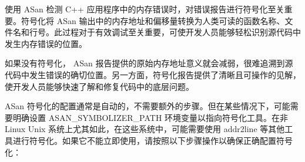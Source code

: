 
使用 ASan 检测 C++ 应用程序中的内存错误时，对错误报告进行符号化至关重要。符号化将 ASan 输出中的内存地址和偏移量转换为人类可读的函数名称、文件名和行号。此过程对于有效调试至关重要，可使开发人员能够轻松识别源代码中发生内存错误的位置。

如果没有符号化， ASan 报告提供的原始内存地址意义就会减弱，很难追溯到源代码中发生错误的确切位置。另一方面，符号化报告提供了清晰且可操作的见解，使开发人员能够快速了解和修复代码中的底层问题。

ASan 符号化的配置通常是自动的，不需要额外的步骤。但在某些情况下，可能需要明确设置 ASAN\_SYMBOLIZER\_PATH 环境变量以指向符号化工具。在非 Linux Unix 系统上尤其如此，在这些系统中，可能需要使用 addr2line 等其他工具进行符号化。如果它不能立即使用，请按照以下步骤操作以确保正确配置符号化：

